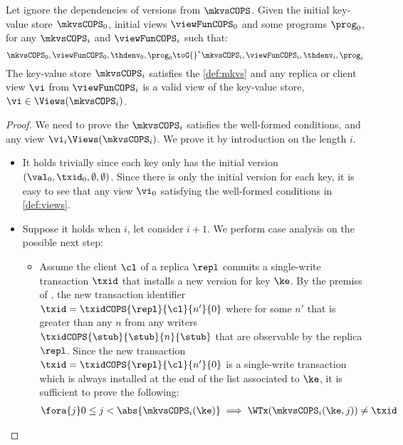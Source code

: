 \begin{theorem}
    \label{thm:cops-key-value-well-form}
    Let ignore the dependencies of versions from \( \mkvsCOPS \).
    Given the initial key-value store \( \mkvsCOPS_0 \), initial views \( \viewFunCOPS_0 \) and some programs \( \prog_0 \), for any \( \mkvsCOPS_i \) and \( \viewFunCOPS_i \)  such that: 
    \[
        \mkvsCOPS_0, \viewFunCOPS_0, \thdenv_0, \prog_0 {\toG{}}^* \mkvsCOPS_i, \viewFunCOPS_i, \thdenv_i, \prog_i
    \]
    The key-value store \( \mkvsCOPS_i \) satisfies the \cref{def:mkvs} and any replica or client view \( \vi \) from \( \viewFunCOPS_i \) is a valid view of the key-value store, \ie \( \vi \in \Views(\mkvsCOPS_i) \).
\end{theorem}
\begin{proof}
    We need to prove the  \( \mkvsCOPS_i \) satisfies the well-formed conditions,
    and any view \( \vi_i \Views(\mkvsCOPS_i) \).
    We prove it by introduction on the length \( i \).
    \begin{itemize}
    \item {}
        It holds trivially since each key only has the initial version \( (\val_0,\txid_0,\emptyset, \emptyset) \).
        Since there is only the initial version for each key, it is easy to see that any view \( \vi_0 \) satisfying the well-formed conditions in \cref{def:views}.
    \item {}
        Suppose it holds when \( i \), let consider \( i + 1 \).
        We perform case analysis on the possible next step:
        \begin{itemize}
            \item {}
                Assume the client \( \cl \) of a replica \( \repl \) commits a single-write transaction \( \txid \) that installs a new version for key \( \ke \).
                By the premiss of , the new transaction identifier \( \txid = \txidCOPS{\repl}{\cl}{n'}{0} \) where for some \( n' \) that is greater than any \( n \) from any writers \( \txidCOPS{\stub}{\stub}{n}{\stub} \) that are observable by the replica \( \repl \).
                Since the new transaction \( \txid = \txidCOPS{\repl}{\cl}{n'}{0} \) is a single-write transaction which is always installed at the end of the list associated to \( \ke \), it is sufficient to prove the following:
                \begin{gather}
                    \fora{j} 0 \leq j < \abs{ \mkvsCOPS_i(\ke) } \implies \WTx(\mkvsCOPS_{i}(\ke, j)) \neq \txid \label{equ:write-trans-unique} \\

\end{gather}
\end{itemize}
\end{itemize}
\end{proof}
